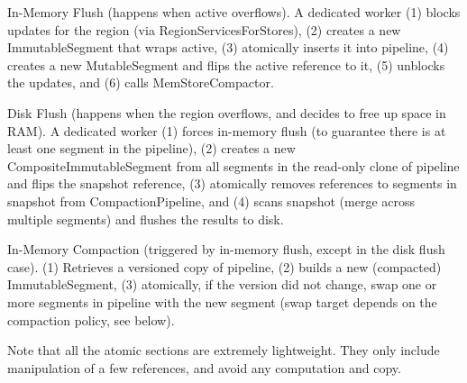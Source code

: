 In-Memory Flush (happens when active overflows). A dedicated worker (1) blocks updates for the region (via RegionServicesForStores), (2) creates a new ImmutableSegment that wraps active, (3) atomically inserts it into pipeline, (4) creates a new MutableSegment and flips the active reference to it, (5) unblocks the updates, and (6) calls MemStoreCompactor. 

Disk Flush (happens when the region overflows, and decides to free up space in RAM). A dedicated worker (1) forces in-memory flush (to guarantee there is at least one segment in the pipeline), (2) creates a new CompositeImmutableSegment from all segments in the read-only clone of pipeline and flips the snapshot reference, (3) atomically removes references to segments in snapshot from CompactionPipeline, and (4) scans snapshot (merge across multiple segments) and flushes the results to disk. 

In-Memory Compaction (triggered by in-memory flush, except in the disk flush case). (1) Retrieves a versioned copy of pipeline, (2) builds a new (compacted) ImmutableSegment, (3) atomically, if the version did not change, swap one or more segments in pipeline with the new segment (swap target depends on the compaction policy, see below). 

Note that all the atomic sections are extremely lightweight. They only include manipulation of a few references, and avoid any computation and copy. 